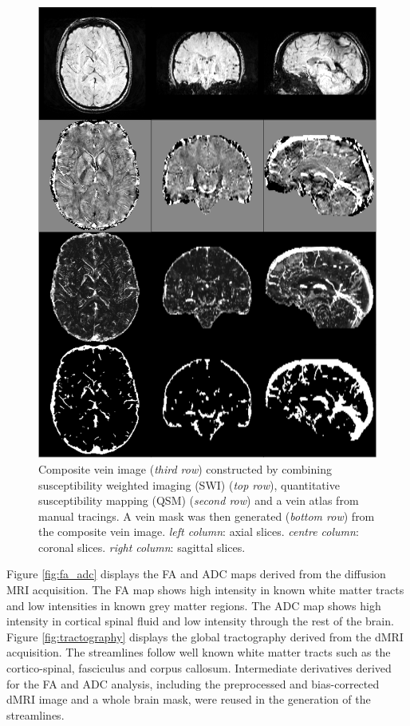 \documentclass[smallextended]{svjour3}       %
\begin{document}
\begin{figure}
    \centering
    \includegraphics[width=\textwidth]{figures/veins}
  \caption{Composite vein image (\emph{third row}) constructed by
  combining susceptibility weighted imaging (SWI) (\emph{top row}),
  quantitative susceptibility mapping (QSM) (\emph{second row})
  and a vein atlas from manual tracings. A vein mask was then
  generated (\emph{bottom row}) from the composite
  vein image.
  \emph{left column}: axial slices. \emph{centre column}: coronal slices.
  \emph{right column}: sagittal slices.}
\label{fig:veins}
\end{figure}

Figure \ref{fig:fa_adc}  displays the FA and ADC maps derived from the diffusion MRI
acquisition. The FA map shows high intensity in known white matter
tracts and low intensities in known grey matter regions. The ADC map
shows high intensity in cortical spinal fluid and low intensity through
the rest of the brain.
Figure \ref{fig:tractography} displays the global tractography derived from the dMRI
acquisition. The streamlines follow well known white matter tracts such
as the cortico-spinal, fasciculus and corpus callosum. Intermediate
derivatives derived for the FA and ADC analysis, including the
preprocessed and bias-corrected dMRI image and a whole brain mask, were
reused in the generation of the streamlines.
\end{document}
